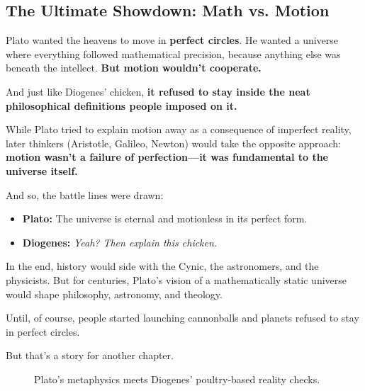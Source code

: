 \subsection{The Ultimate Showdown: Math vs. Motion}

Plato wanted the heavens to move in \textbf{perfect circles}. He wanted a universe where everything followed mathematical precision, because anything else was beneath the intellect. \textbf{But motion wouldn’t cooperate.}

And just like Diogenes’ chicken, \textbf{it refused to stay inside the neat philosophical definitions people imposed on it.}

While Plato tried to explain motion away as a consequence of imperfect reality, later thinkers (Aristotle, Galileo, Newton) would take the opposite approach: \textbf{motion wasn’t a failure of perfection—it was fundamental to the universe itself.} 

And so, the battle lines were drawn:

\begin{itemize}
    \item \textbf{Plato:} The universe is eternal and motionless in its perfect form.  
    \item \textbf{Diogenes:} \textit{Yeah? Then explain this chicken.}  
\end{itemize}

In the end, history would side with the Cynic, the astronomers, and the physicists. But for centuries, Plato’s vision of a mathematically static universe would shape philosophy, astronomy, and theology.

Until, of course, people started launching cannonballs and planets refused to stay in perfect circles.

But that’s a story for another chapter.

\begin{figure}[H]
\centering
{}
\caption{Plato’s metaphysics meets Diogenes’ poultry-based reality checks.}
\end{figure}